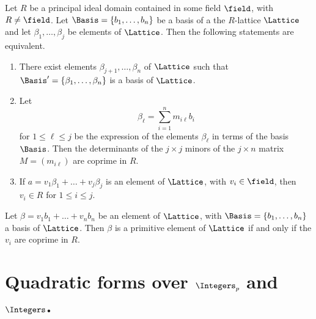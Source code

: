 \begin{theoremx}\label{thm:quadratic-form-lattice-equiv-conditions}
    Let \(R\) be a principal ideal domain contained in some field \(\field\), with \(R \neq \field\). Let \(\Basis = \{b_1, \dots, b_n\}\) be a basis of a the \(R\)-lattice \(\Lattice\) and let \(\beta_1, \dots, \beta_j\) be elements of \(\Lattice\). Then the following statements are equivalent.

    \medskip

    \begin{enumerate}[nosep, label=(\alph*)]
        \item There exist elements \(\beta_{j+1}, \dots, \beta_n\) of \(\Lattice\) such that \(\Basis' = \{\beta_1, \dots, \beta_n\}\) is a basis of \(\Lattice\).
        \item Let \[\beta_{\ell} = \sum_{i=1}^n m_{i\ell} b_i\] for \(1 \leq \ell \leq j\) be the expression of the elements \(\beta_{\ell}\) in terms of the basis \(\Basis\). Then the determinants of the \(j \times j\) minors of the \(j \times n\) matrix \(M = (m_{i\ell})\) are coprime in \(R\).
        \item If \(a = v_1\beta_1 + \dots + v_j\beta_j\) is an element of \(\Lattice\), with \(v_i \in \field\), then \(v_i \in R\) for \(1 \leq i \leq j\).
    \end{enumerate}
\end{theoremx}

\begin{corollary}
    Let \(\beta = v_1b_1 + \dots + v_nb_n\) be an element of \(\Lattice\), with \(\Basis = \{b_1, \dots, b_n\}\) a basis of \(\Lattice\). Then \(\beta\) is a primitive element of \(\Lattice\) if and only if the \(v_i\) are coprime in \(R\).
\end{corollary}

\section{Quadratic forms over \(\Integers_p\) and \(\Integers\).}
